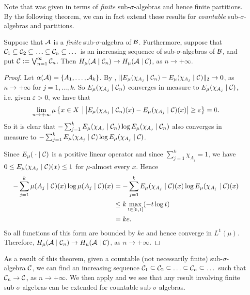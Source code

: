 Note that  was given in terms of \emph{finite} sub-$\sigma$-algebras and hence finite partitions. By the following theorem, we can in fact extend these results for \emph{countable} sub-$\sigma$-algebras and partitions.

\begin{theorem} \label{thm:walters-4-7}
	Suppose that $\mathcal{A}$ is a \emph{finite} sub-$\sigma$-algebra of $\mathcal{B}$. Furthermore, suppose that $\C_1 \subset \C_2 \subset \dots \subset \C_n \subset \dots$ is an increasing sequence of sub-$\sigma$-algebras of $\mathcal{B}$, and put $\mathcal{C}:= \bigvee_{n = 1}^\infty{\mathcal{C}_n}$. Then $H_\mu(\mathcal{A} \mid \mathcal{C}_n) \to H_\mu(\mathcal{A} \mid \mathcal{C})$, as $n \to +\infty$.
	\begin{proof}
		Let $\alpha(\mathcal{A}) = \{A_1, \dots, \mathcal{A}_k\}$. By , $\|E_\mu(\chi_{A_j} \mid \mathcal{C}_n) - E_\mu(\chi_{A_j} \mid \mathcal{C})\|_2 \to 0$, as $n \to +\infty$ for $j = 1, \dots, k$. So $E_\mu(\chi_{A_j} \mid \mathcal{C}_n)$ converges in measure to $E_\mu(\chi_{A_j} \mid \mathcal{C})$, i.e. given $\varepsilon > 0$, we have that
		\[
			\lim_{n \to +\infty}{\mu\left\{x \in X \mathrel{}\middle|\mathrel{} \left|E_\mu(\chi_{A_j} \mid \mathcal{C}_n)(x) - E_\mu(\chi_{A_j} \mid \mathcal{C})(x)\right| \geq \varepsilon\right\}} = 0.
		\]
		So it is clear that $-\sum_{j = 1}^k{E_\mu(\chi_{A_j} \mid \mathcal{C}_n) \log{E_\mu(\chi_{A_j} \mid \mathcal{C}_n)}}$ also converges in measure to $-\sum_{j = 1}^k{E_\mu(\chi_{A_j} \mid \mathcal{C}) \log{E_\mu(\chi_{A_j} \mid \mathcal{C})}}$.
		
		Since $E_\mu(\mathrel{}\cdot\mathrel{} \mid \mathcal{C})$ is a positive linear operator and since $\sum_{j = 1}^k{\chi_{A_j}} = 1$, we have $0 \leq E_\mu(\chi_{A_j} \mid \mathcal{C})(x) \leq 1$ for $\mu$-almost every $x$. Hence
		\begin{align*}
			-\sum_{j = 1}^k{\mu(A_j \mid \mathcal{C})(x) \log{\mu(A_j \mid \mathcal{C})(x)}} &= -\sum_{j = 1}^k{E_\mu(\chi_{A_j} \mid \mathcal{C})(x) \log{E_\mu(\chi_{A_j} \mid \mathcal{C})(x)}} \\
				&\leq k \max_{t \in [0, 1]}(-t \log{t}) \\
				&= ke.
		\end{align*}
		So all functions of this form are bounded by $ke$ and hence converge in $L^1(\mu)$. Therefore, $H_\mu(\mathcal{A} \mid \mathcal{C}_n) \to H_\mu(\mathcal{A} \mid \mathcal{C})$, as $n \to +\infty$.
	\end{proof}
\end{theorem}

As a result of this theorem, given a countable (not necessarily finite) sub-$\sigma$-algebra $\mathcal{C}$, we can find an increasing sequence $\C_1 \subset \C_2 \subset \dots \subset \C_n \subset \dots$ such that $\mathcal{C}_n \to \mathcal{C}$, as $n \to +\infty$. We then apply  and we see that any result involving finite sub-$\sigma$-algebras can be extended for countable sub-$\sigma$-algebras.

